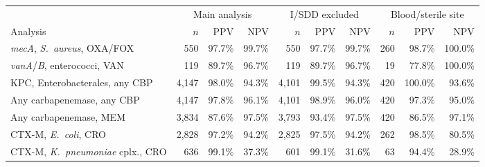 \begin{tabular}{lrrrrrrrrr}
\hline\hline
 & \multicolumn{3}{c}{Main analysis} & \multicolumn{3}{c}{I/SDD excluded} & \multicolumn{3}{c}{Blood/sterile site} \\ \cline{2-4}\cline{5-7}\cline{8-10} Analysis & $n$ & PPV & NPV & $n$ & PPV & NPV & $n$ & PPV & NPV \\
\hline
\textit{mecA}, \textit{S.~aureus}, OXA/FOX & 550 & 97.7\% & 99.7\% & 550 & 97.7\% & 99.7\% & 260 & 98.7\% & 100.0\% \\
\textit{vanA}/\textit{B}, enterococci, VAN & 119 & 89.7\% & 96.7\% & 119 & 89.7\% & 96.7\% & 19 & 77.8\% & 100.0\% \\
KPC, Enterobacterales, any CBP & 4{,}147 & 98.0\% & 94.3\% & 4{,}101 & 99.5\% & 94.3\% & 420 & 100.0\% & 93.6\% \\
Any carbapenemase, any CBP & 4{,}147 & 97.8\% & 96.1\% & 4{,}101 & 98.9\% & 96.0\% & 420 & 97.3\% & 95.0\% \\
Any carbapenemase, MEM & 3{,}834 & 87.6\% & 97.5\% & 3{,}793 & 93.4\% & 97.5\% & 420 & 86.5\% & 97.1\% \\
CTX-M, \textit{E.~coli}, CRO & 2{,}828 & 97.2\% & 94.2\% & 2{,}825 & 97.5\% & 94.2\% & 262 & 98.5\% & 80.5\% \\
CTX-M, \textit{K.~pneumoniae} cplx., CRO & 636 & 99.1\% & 37.3\% & 601 & 99.1\% & 31.6\% & 63 & 94.4\% & 28.9\% \\
\hline\hline
\end{tabular}
